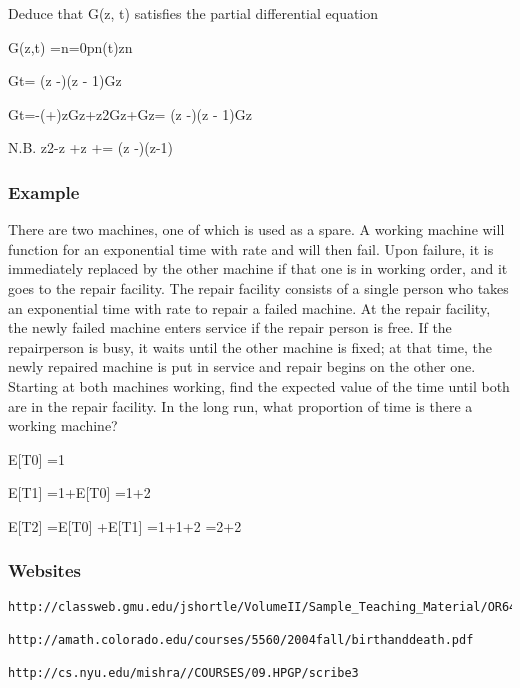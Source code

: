 Deduce that G(z, t) satisfies the partial differential equation

G(z,t) =n=0pn(t)zn



Gt= (z -)(z - 1)Gz


Gt=-(+)zGz+z2Gz+Gz= (z -)(z - 1)Gz


N.B. z2-z +z += (z -)(z-1)

\subsubsection*{Example}
There are two machines, one of which is used as a spare. A working machine will function for an exponential time with rate  and will then fail. Upon failure, it is immediately replaced by the other machine if that one is in working order, and it goes to the repair facility. The repair facility consists of a single person who takes an exponential time with rate  to repair a failed machine. At the repair facility, the newly failed machine enters service if the repair person is free. If the repairperson is busy, it waits until the other machine is fixed; at that time, the newly repaired machine is put in service and repair begins on the other one. Starting at both machines working, find the expected value of the time until both are in the repair facility. In the long run, what proportion of time is there a working machine?

E[T0] =1

E[T1] =1+E[T0] =1+2  

E[T2] =E[T0] +E[T1] =1+1+2 =2+2  

\subsubsection*{Websites}

\begin{verbatim}
http://classweb.gmu.edu/jshortle/VolumeII/Sample_Teaching_Material/OR645/Lectures/Lecture7.pdf

http://amath.colorado.edu/courses/5560/2004fall/birthanddeath.pdf

http://cs.nyu.edu/mishra//COURSES/09.HPGP/scribe3
\end{verbatim}


